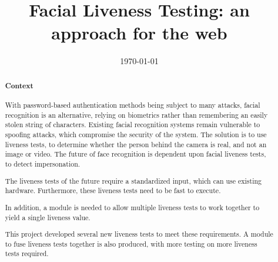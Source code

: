 \documentclass[10pt,a4paper]{article}
\title{Facial Liveness Testing: an approach for the web}
\author{} %
\date{\today}
\begin{document}
\maketitle
\begin{abstract}
\paragraph{Context}
With password-based authentication methods being subject to many attacks, facial recognition is an alternative, relying on biometrics rather than remembering an easily stolen string of characters.
Existing facial recognition systems remain vulnerable to spoofing attacks, which compromise the security of the system. The solution is to use liveness tests, to determine whether the person behind the camera is real, and not an image or video. The future of face recognition is dependent upon facial liveness tests, to detect impersonation. 

The liveness tests of the future require a standardized input, which can use existing hardware. Furthermore, these liveness tests need to be fast to execute.

In addition, a module is needed to allow multiple liveness tests to work together to yield a single liveness value.

This project developed several new liveness tests to meet these requirements. A module to fuse liveness tests together is also produced, with more testing on more liveness tests required.


\end{abstract}
\end{document}

